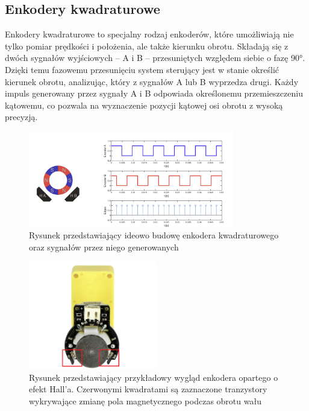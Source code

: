 \subsection{Enkodery kwadraturowe}

Enkodery kwadraturowe to specjalny rodzaj enkoderów, które umożliwiają nie tylko pomiar prędkości i położenia, ale także kierunku obrotu. Składają się z dwóch sygnałów wyjściowych – A i B – przesuniętych względem siebie o fazę 90°. Dzięki temu fazowemu przesunięciu system sterujący jest w stanie określić kierunek obrotu, analizując, który z sygnałów A lub B wyprzedza drugi. Każdy impuls generowany przez sygnały A i B odpowiada określonemu przemieszczeniu kątowemu, co pozwala na wyznaczenie pozycji kątowej osi obrotu z wysoką precyzją.


\begin{figure}[h]
    \centering
    \includegraphics[width=0.8\textwidth]{./graf/enkoders.png}
    \caption{Rysunek przedstawiający ideowo budowę enkodera kwadraturowego oraz sygnałów przez niego generowanych \cite{bib:encoders-pid}}
    \label{rys2:encoders-graf}
\end{figure}


\begin{figure}[h]
    \centering
    \includegraphics[width=0.5\textwidth]{./graf/enkoder-silnik.png}
    \caption{Rysunek przedstawiający przykładowy wygląd enkodera opartego o efekt Hall'a. Czerwonymi kwadratami są zaznaczone tranzystory wykrywające zmianę pola magnetycznego podczas obrotu wału \cite{bib:botland-hall}}
    \label{rys2:encoders-graf}
\end{figure}

